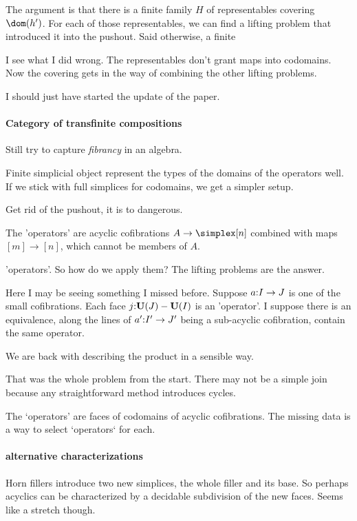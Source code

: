 \documentclass[csh.tex]{subfiles}
\begin{document}
The argument is that there is a finite family $H$ of representables covering $\dom(h')$. For each of those representables, we can find a lifting problem that introduced it into the pushout. Said otherwise, a finite 

I see what I did wrong. The representables don't grant maps into codomains. Now the covering gets in the way of combining the other lifting problems.

I should just have started the update of the paper.

\paragraph{Category of transfinite compositions}
Still try to capture \emph{fibrancy} in an algebra.

Finite simplicial object represent the types of the domains of the operators well. If we stick with full simplices for codomains, we get a simpler setup.
 
Get rid of the pushout, it is to dangerous.

The 'operators' are acyclic cofibrations $A \to \simplex[n]$ combined with maps $[m]\to [n]$, which cannot be members of $A$. 

'operators'. So how do we apply them? The lifting problems are the answer. 

Here I may be seeing something I missed before.
Suppose $a\mathord : I\to J$ is one of the small cofibrations. Each face $j\mathord :\mathbf{U}(J)-\mathbf{U}(I)$ is an 'operator'.
I suppose there is an equivalence, along the lines of $a'\mathord : I'\to J'$ being a sub-acyclic cofibration, contain the same operator.

We are back with describing the product in a sensible way. 

That was the whole problem from the start. There may not be a simple join because any straightforward method introduces cycles.

The `operators' are faces of codomains of acyclic cofibrations. The missing data is a way to select `operators` for each.


\paragraph{alternative characterizations}
Horn fillers introduce two new simplices, the whole filler and its base. So perhaps acyclics can be characterized by a decidable subdivision of the new faces. Seems like a stretch though.
\end{document}

